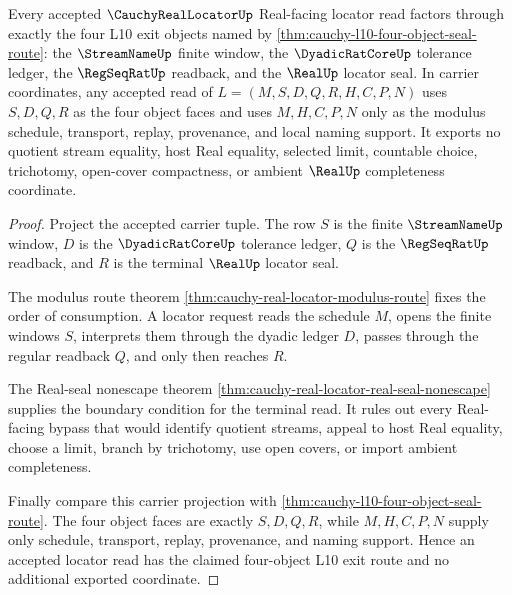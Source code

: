 \begin{theorem}
\label{thm:cauchy-real-locator-four-object-exit}
Every accepted $\CauchyRealLocatorUp$ Real-facing locator read factors through exactly the four L10 exit objects named by \autoref{thm:cauchy-l10-four-object-seal-route}: the $\StreamNameUp$ finite window, the $\DyadicRatCoreUp$ tolerance ledger, the $\RegSeqRatUp$ readback, and the $\RealUp$ locator seal. In carrier coordinates, any accepted read of $L=(M,S,D,Q,R,H,C,P,N)$ uses $S,D,Q,R$ as the four object faces and uses $M,H,C,P,N$ only as the modulus schedule, transport, replay, provenance, and local naming support. It exports no quotient stream equality, host Real equality, selected limit, countable choice, trichotomy, open-cover compactness, or ambient $\RealUp$ completeness coordinate.
\end{theorem}
\begin{proof}
Project the accepted carrier tuple. The row $S$ is the finite $\StreamNameUp$ window, $D$ is the $\DyadicRatCoreUp$ tolerance ledger, $Q$ is the $\RegSeqRatUp$ readback, and $R$ is the terminal $\RealUp$ locator seal.

The modulus route theorem \autoref{thm:cauchy-real-locator-modulus-route} fixes the order of consumption. A locator request reads the schedule $M$, opens the finite windows $S$, interprets them through the dyadic ledger $D$, passes through the regular readback $Q$, and only then reaches $R$.

The Real-seal nonescape theorem \autoref{thm:cauchy-real-locator-real-seal-nonescape} supplies the boundary condition for the terminal read. It rules out every Real-facing bypass that would identify quotient streams, appeal to host Real equality, choose a limit, branch by trichotomy, use open covers, or import ambient completeness.

Finally compare this carrier projection with \autoref{thm:cauchy-l10-four-object-seal-route}. The four object faces are exactly $S,D,Q,R$, while $M,H,C,P,N$ supply only schedule, transport, replay, provenance, and naming support. Hence an accepted locator read has the claimed four-object L10 exit route and no additional exported coordinate.
\end{proof}

